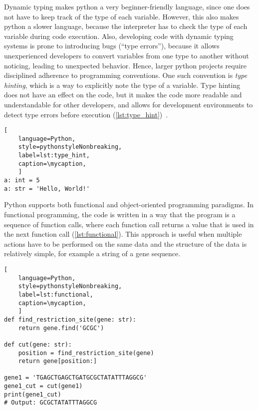 Dynamic typing makes python a very beginner-friendly language, since one does
not have to keep track of the type of each variable. However, this also makes
python a slower language, because the interpreter has to check the type of each
variable during code execution. Also, developing code with dynamic typing
systems is prone to introducing bugs (``type errors''), because it allows
unexperienced developers to convert variables from one type to another without
noticing, leading to unexpected behavior. Hence, larger python projects require
disciplined adherence to programming conventions. One such convention is
\textit{type hinting}, which is a way to explicitly note the type of a
variable. Type hinting does not have an effect on the code, but it makes the
code more readable and understandable for other developers, and allows for
development environments to detect type errors before execution
(\autoref{lst:type_hint})~\cite{vanrossumPEP484Type2014}.

\def\mycaption{
    Example of type hints used in python. Explicitly stating the type of the
    variable is optional and does not change the behavior of the code as shown in
    \autoref{lst:dynamic_typing}.}
\begin{lstlisting}[
    language=Python,
    style=pythonstyleNonbreaking,
    label=lst:type_hint,
    caption=\mycaption,
    ]
a: int = 5
a: str = 'Hello, World!'
\end{lstlisting}


Python supports both functional and object-oriented programming paradigms. In
functional programming, the code is written in a way that the program is a
sequence of function calls, where each function call returns a value that is
used in the next function call (\autoref{lst:functional}). This approach is
useful when multiple actions have to be performed on the same data and the
structure of the data is relatively simple, for example a string of a gene
sequence.

\def\mycaption{ Example of functional programming in Python. The code
    defines a function called ``\texttt{find\_restriction\_site}'' that
    finds the position of a restriction site in a gene. The function
    ``\texttt{cut}'' uses the function ``\texttt{find\_restriction\_site}''
    to cut the gene at the restriction site.}
\begin{lstlisting}[
    language=Python,
    style=pythonstyleNonbreaking,
    label=lst:functional,
    caption=\mycaption,
    ]
def find_restriction_site(gene: str):
    return gene.find('GCGC')
    
def cut(gene: str):
    position = find_restriction_site(gene)
    return gene[position:]   
    
gene1 = 'TGAGCTGAGCTGATGCGCTATATTTAGGCG'
gene1_cut = cut(gene1)
print(gene1_cut)
# Output: GCGCTATATTTAGGCG
    
    
\end{lstlisting}


